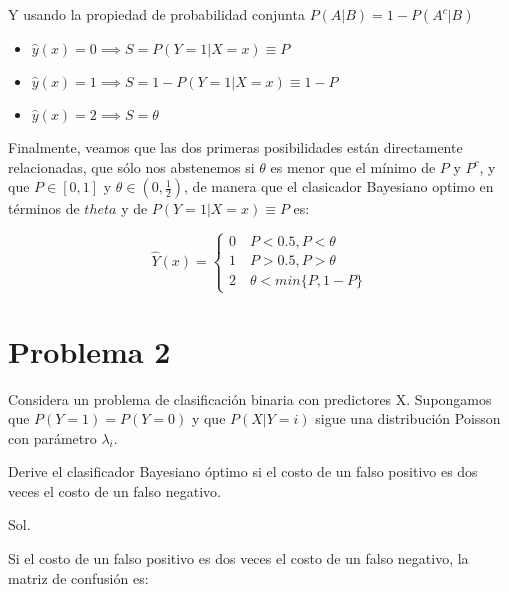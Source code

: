 \documentclass[letter, 11pt, twoside]{report}
\begin{document}
Y usando la propiedad de probabilidad conjunta $P(A|B)=1-P(A^c|B)$


\begin{itemize}
    \item $\hat{y}(x)=0\implies S=P(Y=1|X=x)\equiv P$
    \item $\hat{y}(x)=1\implies S=1-P(Y=1|X=x)\equiv 1-P$
    \item $\hat{y}(x)=2\implies S=\theta$
\end{itemize}

Finalmente, veamos que las dos primeras posibilidades están directamente relacionadas, que sólo nos abstenemos si $\theta$ es menor
que el mínimo de $P$ y $P^c$, y que $P\in [0,1]$ y $\theta\in (0,\frac{1}{2})$, de manera que el  clasicador Bayesiano 
optimo en términos de $theta$ y de $P(Y=1|X=x)\equiv P$ es:


 \begin{equation}
   \hat{Y}(x) =
        \begin{cases}
        0 \quad P<0.5 , P<\theta\\
        1 \quad P>0.5 , P>\theta\\
        2 \quad \theta < min \{P,1-P\}
        \end{cases}
        \label{prediccion}
\end{equation}


{\color{mirosa}\section*{Problema 2}}
Considera un problema de clasificaci\'{o}n binaria con predictores X.  Supongamos
que $P(Y = 1) = P(Y = 0)$ y que $P(X|Y = i)$ sigue una distribuci\'{o}n
Poisson con par\'{a}metro $\lambda_i$.

Derive el clasificador Bayesiano  \'{o}ptimo si el costo de un falso positivo
es dos veces el costo de un falso negativo.



{\color{mirosa}Sol.}

Si el costo de un falso positivo es dos veces el costo de un falso negativo, la matriz de confusión es:
\end{document}
